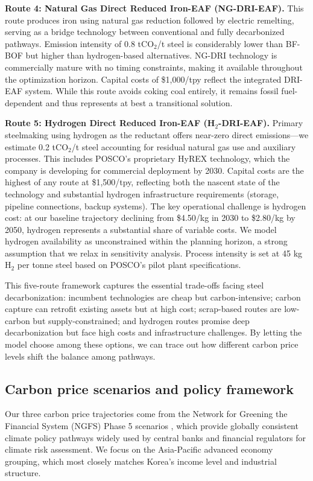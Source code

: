 \textbf{Route 4: Natural Gas Direct Reduced Iron-EAF (NG-DRI-EAF).} This route produces iron using natural gas reduction followed by electric remelting, serving as a bridge technology between conventional and fully decarbonized pathways. Emission intensity of 0.8 tCO$_2$/t steel is considerably lower than BF-BOF but higher than hydrogen-based alternatives. NG-DRI technology is commercially mature with no timing constraints, making it available throughout the optimization horizon. Capital costs of \$1,000/tpy reflect the integrated DRI-EAF system. While this route avoids coking coal entirely, it remains fossil fuel-dependent and thus represents at best a transitional solution.

\textbf{Route 5: Hydrogen Direct Reduced Iron-EAF (H$_2$-DRI-EAF).} Primary steelmaking using hydrogen as the reductant offers near-zero direct emissions—we estimate 0.2 tCO$_2$/t steel accounting for residual natural gas use and auxiliary processes. This includes POSCO's proprietary HyREX technology, which the company is developing for commercial deployment by 2030. Capital costs are the highest of any route at \$1,500/tpy, reflecting both the nascent state of the technology and substantial hydrogen infrastructure requirements (storage, pipeline connections, backup systems). The key operational challenge is hydrogen cost: at our baseline trajectory declining from \$4.50/kg in 2030 to \$2.80/kg by 2050, hydrogen represents a substantial share of variable costs. We model hydrogen availability as unconstrained within the planning horizon, a strong assumption that we relax in sensitivity analysis. Process intensity is set at 45 kg H$_2$ per tonne steel based on POSCO's pilot plant specifications.

This five-route framework captures the essential trade-offs facing steel decarbonization: incumbent technologies are cheap but carbon-intensive; carbon capture can retrofit existing assets but at high cost; scrap-based routes are low-carbon but supply-constrained; and hydrogen routes promise deep decarbonization but face high costs and infrastructure challenges. By letting the model choose among these options, we can trace out how different carbon price levels shift the balance among pathways.

\subsection{Carbon price scenarios and policy framework}

Our three carbon price trajectories come from the Network for Greening the Financial System (NGFS) Phase 5 scenarios \citep{NGFS2024}, which provide globally consistent climate policy pathways widely used by central banks and financial regulators for climate risk assessment. We focus on the Asia-Pacific advanced economy grouping, which most closely matches Korea's income level and industrial structure.

